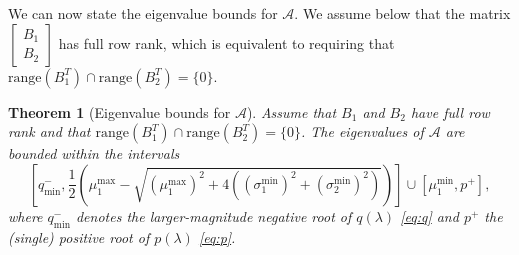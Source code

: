 \documentclass{article}
\newtheorem{theorem}{Theorem}
\newcommand{\range}{\mathrm{range}}
\newcommand{\sA}{\mathcal{A}}
\begin{document}
We can now state the eigenvalue bounds for $\sA$. We assume below that the matrix $\begin{bmatrix} B_1 \\ B_2 \end{bmatrix}$ has full row rank, which is equivalent to requiring that $\range(B_1^T) \cap \range(B_2^T) = \{ 0\}$.

\begin{theorem}[Eigenvalue bounds for $\sA$]
    Assume that $B_1$ and $B_2$ have full row rank and that $\range(B_1^T) \cap \range(B_2^T) = \{ 0\}$. The eigenvalues of $\sA$ are bounded within the intervals
    \[
    \left[ q_{\min}^{-}, \frac12\left( \mu_1^{\max} - \sqrt{(\mu_1^{\max})^2 +4\left( (\sigma_1^{\min})^2 +(\sigma_2^{\min})^2\right)} \right) \right] \cup \left[ \mu_1^{\min}, p^+ \right],
    \]
    where $q_{\min}^{-}$ denotes the larger-magnitude negative root of $q(\lambda)$ \eqref{eq:q} and $p^+$ the (single) positive root of $p(\lambda)$ \eqref{eq:p}.
    \label{thm:sa_eig}
\end{theorem}
\end{document}
